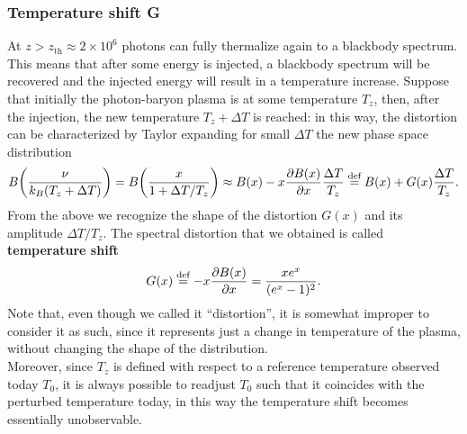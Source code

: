 \subsubsection{Temperature shift G}
At $z>z_\text{th}\approx2\times10^6$ photons can fully thermalize again to a blackbody spectrum. This means that after some energy is injected, a blackbody spectrum will be recovered and the injected energy will result in a temperature increase. Suppose that initially the photon-baryon plasma is at some temperature $T_z$, then, after the injection, the new temperature $T_z+\Delta T$ is reached: in this way, the distortion can be characterized by Taylor expanding for small $\Delta T$ the new phase space distribution 
$$B\bigg(\frac{\nu}{k_B(T_z+\Delta T)}\bigg)=B\bigg(\frac{x}{1+\Delta T/T_z}\bigg)\approx B(x)-x\frac{\partial B(x)}{\partial x}\frac{\Delta T}{T_z}\stackrel{\text{def}}{=} B(x)+G(x)\frac{\Delta T}{T_z}.$$
From the above we recognize the shape of the distortion $G(x)$ and its amplitude $\Delta T/T_z$. The spectral distortion that we obtained is called \textbf{temperature shift}
\begin{equation}
    \label{eq:SD_temperature_shift}
    G(x)\stackrel{\text{def}}{=}-x\frac{\partial B(x)}{\partial x}=\frac{xe^x}{(e^x-1)^2}.
\end{equation}
Note that, even though we called it ``distortion'', it is somewhat improper to consider it as such, since it represents just a change in temperature of the plasma, without changing the shape of the distribution.\\ 
Moreover, since $T_z$ is defined with respect to a reference temperature observed today $T_0$, it is always possible to readjust $T_0$ such that it coincides with the perturbed temperature today, in this way the temperature shift becomes essentially unobservable. 

